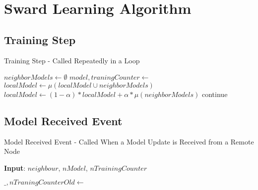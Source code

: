 \appendix

\chapter{Sward Learning Algorithm} \label{slalgo}
\section{Training Step} \label{slalgo:ul}
\begin{algorithm}[H]
	\caption{Training Step - Called Repeatedly in a Loop}
	\begin{algorithmic}[1]
		\State {}
		\State {}
		\EndFor
		
		\State $neighborModels \gets \emptyset$
		\State $model, traningCounter \gets$ 
		\State {}
		\EndIf
		\EndFor
		\State $localModel \gets \mu(localModel \cup neighborModels)$
		\State $localModel \gets (1 - \alpha) * localModel + \alpha * \mu(neighborModels)$
		\EndIf
		\Else
		\State continue
		\EndIf
		\State {}
		\EndFor
	\end{algorithmic}
\end{algorithm}

\section{Model Received Event} \label{slalgo:mre}
\begin{algorithm}[H]
	\caption{Model Received Event - Called When a Model Update is Received from a Remote Node}
	\textbf{Input}: $neighbour$, $nModel$, $nTrainingCounter$
	\newline
	\begin{algorithmic}[1]
			\State $\_, nTraningCounterOld \gets$ 
				\State {}
			\EndIf
		\Else
			\State {}
		\EndIf
	\end{algorithmic}
\end{algorithm}



